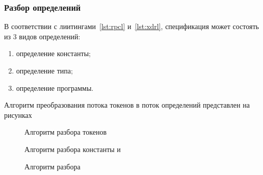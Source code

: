 \subsubsection{Разбор определений}

В соответствии с лиитингами~\ref{lst:rpcl} и~\ref{lst:xdrl}, спецификация может
состоять из 3 видов определений:
\begin{enumerate}
    \item определение константы;
    \item определение типа;
    \item определение программы.
\end{enumerate}

Алгоритм преобразования потока токенов в поток определений представлен на
рисунках~

\begin{figure}[!h]
    \centering
    \def\svgwidth{\textwidth}
    
    \caption{Алгоритм разбора токенов}
    \label{fig:parser_alg}
\end{figure}

\clearpage

\vspace*{\fill}
\begin{figure}[!h]
    \centering
    \begin{minipage}{0.63\textwidth}\centering
        \def\svgwidth{\linewidth}
        
    \end{minipage}
    \hfill
    \begin{minipage}{0.35\textwidth}\centering
        \def\svgwidth{\linewidth}
        
    \end{minipage}
    \caption{Алгоритм разбора константы и }
    \label{fig:parser_const_typedef_alg}
\end{figure}
\vfill
\begin{figure}[!h]
    \centering
    \begin{minipage}{0.6\textwidth}\centering
        \def\svgwidth{\linewidth}
        
    \end{minipage}
    \hfill
    \begin{minipage}{0.35\textwidth}\centering
        \def\svgwidth{\linewidth}
        
    \end{minipage}
    \caption{Алгоритм разбора }
    \label{fig:parser_enum_alg}
\end{figure}
\vfill


